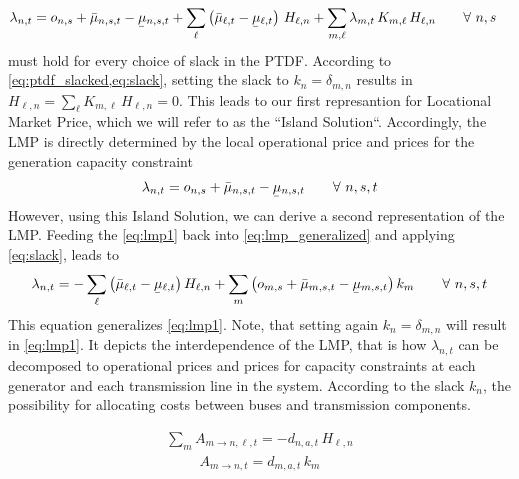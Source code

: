 \documentclass[11pt]{article}
\newcommand{\ubar}[1]{\underaccent{\bar}{#1}}
\newcommand{\opexGeneration}[1][n]{o_{#1,s}}
\newcommand{\demand}[1][n]{d_{#1,a,t}}
\newcommand{\incidence}[1][n]{K_{#1,\ell}}
\newcommand{\ptdf}[1][n]{H_{\ell,#1}}
\newcommand{\slack}[1][n]{k_{#1}}
\newcommand{\mulowergeneration}[1][n]{\ubar{\mu}_{#1,s,t}}
\newcommand{\muuppergeneration}[1][n]{\bar{\mu}_{#1,s,t}}
\newcommand{\mulowerflow}{\ubar{\mu}_{\ell,t}}
\newcommand{\muupperflow}{\bar{\mu}_{\ell,t}}
\newcommand{\lmp}[1][n]{\lambda_{#1,t}}
\newcommand{\allocatePeer}[1][n \rightarrow m]{A_{#1,t}}
\newcommand{\allocateTransaction}[1][n \rightarrow m]{A_{#1,\ell,t}}
\newcommand{\Forall}[1]{\hspace{20pt} \forall \,\, #1 }
\begin{document}
\begin{align}
\lmp &= \opexGeneration  + \muuppergeneration - \mulowergeneration + \sum_{\ell} \left( \muupperflow - \mulowerflow\right)  \, \ptdf + \sum_{m,\ell}\lmp[m] \, \incidence[m] \, \ptdf   \Forall{n,s} \label{eq:lmp_generalized}
\end{align}
% 
 must hold for every choice of slack in the PTDF. According to \cref{eq:ptdf_slacked,eq:slack}, setting the slack to $\slack = \delta_{m,n}$ results in $\ptdf = \sum_\ell \incidence[m] \, \ptdf = 0$. This leads to our first represantion for Locational Market Price, which we will refer to as the ``Island Solution``. Accordingly, the LMP is directly determined by the local operational price and prices for the generation capacity constraint
\begin{align}
\lmp  =  \opexGeneration + \muuppergeneration - \mulowergeneration \Forall{n,s,t}
\label{eq:lmp1}
\end{align}
However, using this Island Solution, we can derive a second representation of the LMP. Feeding the \cref{eq:lmp1} back into \cref{eq:lmp_generalized} and applying \cref{eq:slack}, leads to 
\begin{align}
\lmp =  - \sum_\ell \left( \muupperflow - \mulowerflow\right) \ptdf + \sum_m \left( \opexGeneration[m] + \muuppergeneration[m] - \mulowergeneration[m] \right) \slack[m] \Forall{n,s,t} 
\end{align}
This equation generalizes \cref{eq:lmp1}. Note, that setting again $\slack = \delta_{m,n}$ will result in \cref{eq:lmp1}. It depicts the interdependence of the LMP, that is how $\lmp$ can be decomposed to operational prices and prices for capacity constraints at each generator and each transmission line in the system. According to the slack $\slack$,  the possibility for allocating costs between buses and transmission components. 


\begin{align}
 \sum_m \allocateTransaction[m \rightarrow n] = - \demand \, \ptdf  
\end{align}
\begin{align}
 \allocatePeer[m \rightarrow n] = \demand[m] \, \slack[m] 
\end{align}
\end{document}
